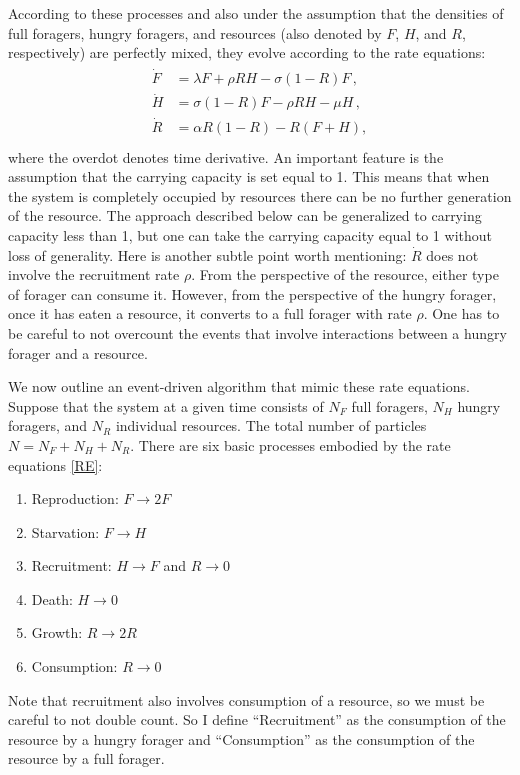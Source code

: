 \documentclass[11pt]{iopart}
\begin{document}
According to these processes and also under the assumption that the densities
of full foragers, hungry foragers, and resources (also denoted by $F$,
$H$, and $R$, respectively) are perfectly mixed, they evolve according to the
rate equations:
\begin{align}
  \label{RE}
\begin{split}
\dot F &= \lambda F + \rho  RH - \sigma (1-R)F\,,\\
\dot H &= \sigma (1-R)F - \rho RH - \mu H\,, \\
\dot R &= \alpha R(1-R) -  R(F+H),\\
\end{split}
\end{align}
where the overdot denotes time derivative.  An important feature is the
assumption that the carrying capacity is set equal to 1.  This means that
when the system is completely occupied by resources there can be no further
generation of the resource.  The approach described below can be generalized
to carrying capacity less than 1, but one can take the carrying capacity
equal to 1 without loss of generality.  Here is another subtle point worth
mentioning: $\dot R$ does not involve the recruitment rate $\rho$.  From the
perspective of the resource, either type of forager can consume it.  However,
from the perspective of the hungry forager, once it has eaten a resource, it
converts to a full forager with rate $\rho$.  One has to be careful to not
overcount the events that involve interactions between a hungry forager and a
resource.

We now outline an event-driven algorithm that mimic these rate equations. 
Suppose that the system at a given time consists of $N_F$ full foragers,
$N_H$ hungry foragers, and $N_R$ individual resources.  The total number of
particles $N=N_F+N_H+N_R$.  There are six basic processes embodied by the
rate equations \eqref{RE}:
\begin{enumerate}
\item Reproduction:  $F\to 2F$
\item Starvation:  $F\to H$
\item Recruitment: $H\to F$ and $R\to 0$
\item Death: $H\to 0$
\item Growth: $R\to 2R$
\item Consumption: $R\to 0$
\end{enumerate}
Note that recruitment also involves consumption of a resource, so we must be
careful to not double count.  So I define ``Recruitment'' as the consumption
of the resource by a hungry forager and ``Consumption'' as the consumption of
the resource by a full forager.
\end{document}
